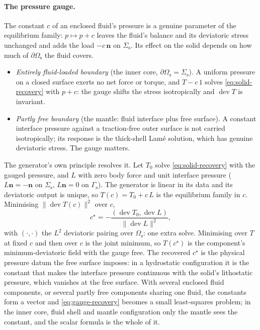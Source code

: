 \documentclass[11pt]{article}
\newcommand{\bn}{\mathbf{n}}
\newcommand{\dev}{\operatorname{dev}}
\newcommand{\norm}[1]{\lVert #1 \rVert}
\begin{document}
\paragraph{The pressure gauge.} The constant $c$ of an enclosed fluid's
pressure is a genuine parameter of the equilibrium family: $p\mapsto
p + c$ leaves the fluid's balance and its deviatoric stress unchanged and
adds the load $-c\,\bn$ on $\Sigma_{\mathrm{s}}$. Its effect on the solid
depends on how much of $\partial\Omega_{\mathrm{s}}$ the fluid covers.
\begin{itemize}
\item \emph{Entirely fluid-loaded boundary} (the inner core,
  $\partial\Omega_{\mathrm{s}} = \Sigma_{\mathrm{s}}$). A uniform pressure
  on a closed surface exerts no net force or torque, and $T - c\,1$ solves
  \eqref{eq:solid-recovery} with $p + c$: the gauge shifts the stress
  isotropically and $\dev T$ is invariant.
\item \emph{Partly free boundary} (the mantle: fluid interface plus free
  surface). A constant interface pressure against a traction-free outer
  surface is not carried isotropically; its response is the thick-shell
  Lam\'e solution, which has genuine deviatoric stress. The gauge
  matters.
\end{itemize}
The generator's own principle resolves it. Let $T_0$ solve
\eqref{eq:solid-recovery} with the gauged pressure, and $L$ with zero body
force and unit interface pressure ($L\bn = -\bn$ on $\Sigma_{\mathrm{s}}$,
$L\bn = 0$ on $\Gamma_{\mathrm{s}}$). The generator is linear in its data
and its deviatoric output is unique, so $T(c) = T_0 + c\,L$ is the
equilibrium family in $c$. Minimising $\norm{\dev T(c)}^{2}$ over $c$,
\begin{equation}
  c^{\star} = -\frac{(\dev T_0, \dev L)}{\norm{\dev L}^{2}} ,
  \label{eq:gauge-recovery}
\end{equation}
with $(\cdot,\cdot)$ the $L^2$ deviatoric pairing over
$\Omega_{\mathrm{s}}$: one extra solve. Minimising over $T$ at fixed $c$
and then over $c$ is the joint minimum, so $T(c^\star)$ is the
component's minimum-deviatoric field with the gauge free. The recovered
$c^\star$ is the physical pressure datum the free surface imposes: in a
hydrostatic configuration it is the constant that makes the interface
pressure continuous with the solid's lithostatic pressure, which
vanishes at the free surface. With several enclosed fluid components, or
several partly free components sharing one fluid, the constants form a
vector and \eqref{eq:gauge-recovery} becomes a small least-squares
problem; in the inner core, fluid shell and mantle configuration only
the mantle sees the constant, and the scalar formula is the whole of it.
\end{document}
